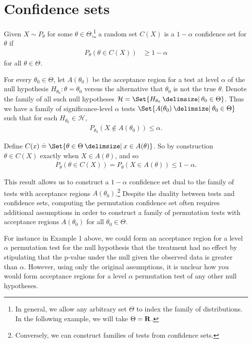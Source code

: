 \section{Confidence sets}

Given $X \sim P_\theta$ for some $\theta \in \Theta$,\footnote{In general, we allow any
arbitrary set $\Theta$ to index the family of distributions. In the following example, we will take $\Theta =\mathbf{R}$.} a random set
$C(X)$ is a $1 - \alpha$ confidence set for $\theta$ if
\begin{align*}
P_\theta(\theta \in C(X)) &\ge 1 - \alpha
\end{align*}
for all $\theta \in \Theta$.

For every $\theta_0 \in \Theta$, let $A(\theta_0)$ be the acceptance region for
a test at level $\alpha$ of the null hypothesis $H_{\theta_0}: \theta =
\theta_0$ versus the alternative that $\theta_0$ is not the true $\theta$.
Denote the family of all such null hypotheses $\mathcal{H} = \Set{H_{\theta_0}
\given \theta_0 \in \Theta}$.  Thus we have a family of significance-level
$\alpha$ tests $\Set{A(\theta_0) \given \theta_0 \in \Theta}$ such that for
each $H_{\theta_0} \in \mathcal{H}$,
\begin{align*}
P_{\theta_0}(X \notin A(\theta_0)) \le \alpha.
\end{align*}

Define $C(x) \doteq \Set{\theta \in \Theta \given x \in A(\theta)}$.
So by construction $\theta \in C(X)$ exactly when $X \in A(\theta)$, and so
\begin{align*}
P_{\theta}(\theta \in C(X)) = P_{\theta}(X \in A(\theta)) \le 1 - \alpha.
\end{align*}

This result allows us to construct a $1-\alpha$ confidence set dual to
the family of tests with acceptance regions $A(\theta_0)$.\footnote{Conversely,
we can construct families of tests from confidence sets.}  Despite the duality
between tests and confidence sets, computing the permutation confidence set
often requires additional assumptions in order to construct a family of
permutation tests with acceptance regions $A(\theta_0)$ for all $\theta_0 \in
\Theta$.

For instance in Example 1 above, we could form an acceptance region for a level
$\alpha$ permutation test for the null hypothesis that the treatment had no
effect by stipulating that the p-value under the null given the observed data
is greater than $\alpha$.  However, using only the original assumptions, it is
unclear how you would form acceptance regions for a level $\alpha$ permutation
test of any other null hypotheses. 

